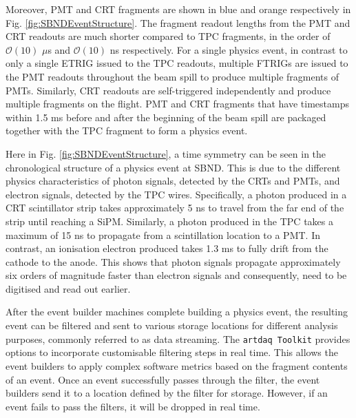 Moreover, PMT and CRT fragments are shown in blue and orange respectively in Fig. \ref{fig:SBNDEventStructure}.
The fragment readout lengths from the PMT and CRT readouts are much shorter compared to TPC fragments, in the order of $\mathcal{O}(10)$ $\mu$s and $\mathcal{O}(10)$ ns respectively.
For a single physics event, in contrast to only a single ETRIG issued to the TPC readouts, multiple FTRIGs are issued to the PMT readouts throughout the beam spill to produce multiple fragments of PMTs.
Similarly, CRT readouts are self-triggered independently and produce multiple fragments on the flight.
PMT and CRT fragments that have timestamps within 1.5 ms before and after the beginning of the beam spill are packaged together with the TPC fragment to form a physics event.


Here in Fig. \ref{fig:SBNDEventStructure}, a time symmetry can be seen in the chronological structure of a physics event at SBND.
This is due to the different physics characteristics of photon signals, detected by the CRTs and PMTs, and electron signals, detected by the TPC wires. 
Specifically, a photon produced in a CRT scintillator strip takes approximately 5 ns to travel from the far end of the strip until reaching a SiPM. 
Similarly, a photon produced in the TPC takes a maximum of 15 ns to propagate from a scintillation location to a PMT.
In contrast, an ionisation electron produced takes 1.3 ms to fully drift from the cathode to the anode.
This shows that photon signals propagate approximately six orders of magnitude faster than electron signals and consequently, need to be digitised and read out earlier.

After the event builder machines complete building a physics event, the resulting event can be filtered and sent to various storage locations for different analysis purposes, commonly referred to as data streaming.
The \texttt{artdaq Toolkit} provides options to incorporate customisable filtering steps in real time. 
This allows the event builders to apply complex software metrics based on the fragment contents of an event. 
Once an event successfully passes through the filter, the event builders send it to a location defined by the filter for storage. 
However, if an event fails to pass the filters, it will be dropped in real time.

